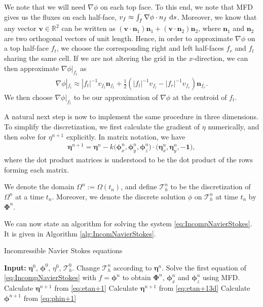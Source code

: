 \documentclass[12pt]{article}
\begin{document}
We note that we will need $\nabla \phi$ on each top face. To this end, we note that MFD gives us the fluxes on each half-face, $v_{f} \approx \int_{f} \nabla \phi \cdot n_{f} \, \operatorname{d}\! s$.
Moreover, we know that any vector $\bm{v} \in \mathbb{R}^2$ can be written as $(\bm{v}\cdot\bm{n}_1) \bm{n}_1 + (\bm{v}\cdot\bm{n}_2) \bm{n}_2$,
where $\bm{n}_1$ and $\bm{n}_2$ are two orthogonal vectors of unit length.
Hence, in order to approximate $\nabla \phi$ on a top half-face $f_t$, we choose the corresponding right and left half-faces $f_r$ and $f_l$ sharing the same cell.
If we are not altering the grid in the $x$-direction, we can then approximate $\nabla \phi|_{f_t}$ as
\begin{align*}
    \nabla \phi|_{f_t} \approx |f_t|^{-1} v_{f_t} \bm{n}_{f_t} + \frac{1}{2}(|f_l|^{-1}v_{f_l}-|f_r|^{-1}v_{f_r})\bm{n}_{f_r}.
\end{align*}
We then choose $\nabla \phi|_{f_t}$ to be our approximation of $\nabla \phi$ at the centroid of $f_t$.

A natural next step is now to implement the same procedure in three dimensions. To simplify the discretization, we first calculate
the gradient of $\eta$ numerically, and then solve for $\eta^{n+1}$ explicitly. In matrix notation, we have
\begin{align}
    \label{eq:etan+13d}
    \bm{\eta}^{n+1} = \bm{\eta}^n - k \big(\bm{\phi}_x^n, \bm{\phi}_y^n, \bm{\phi}_z^n\big)\cdot(\bm{\eta}_x^n, \bm{\eta}_y^n, -\bm{1}\big),
\end{align}
where the dot product matrices is understood to be the dot product of the rows forming each matrix.

We denote the domain $\Omega^n := \Omega(t_n)$, and define $\mathcal{T}_h^n$ to be the discretization of $\Omega^n$
at a time $t_n$. Moreover, we denote the discrete solution $\phi$ on $\mathcal{T}_h^n$ at time $t_n$ by $\bm{\Phi}^n$.

We can now state an algorithm for solving the system \eqref{eq:IncompNavierStokes}. It is given in Algorithm \ref{alg:IncomNavierStokes}.
%
%
\begin{algorithm}
    \caption{Incomressible Navier Stokes equations}
    \begin{algorithmic}[1]
    \State    \textbf{Input:} $\bm{\eta}^0$, $\bm{\phi}^0$, $\eta^0$, $\mathcal{T}_h^0$.
	    \State    Change $\mathcal{T}_h^n$ according to $\bm{\eta}^n$.
            \State    Solve the first equation of \eqref{eq:IncompNavierStokes} with $f = \bm{\phi}^n$ to obtain
                      $\bm{\Phi}^{n}$, $\bm{\phi}_x^n$ and $\bm{\phi}_z^n$ using MFD.
                \State    Calculate $\bm{\eta}^{n+1}$ from \eqref{eq:etan+1}
			    \State    Calculate $\bm{\eta}^{n+1}$ from \eqref{eq:etan+13d}
			\EndIf
        \State    Calculate $\bm{\phi}^{n+1}$ from \eqref{eq:phin+1}
        \EndFor
	\end{algorithmic}
	\label{alg:IncomNavierStokes}
\end{algorithm}
\end{document}
